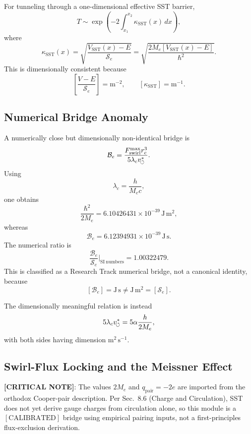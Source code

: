         For tunneling through a one-dimensional effective SST barrier,
        \[
            T
            \sim
            \exp\left(
                    -2\int_{x_1}^{x_2}\kappa_{\mathrm{SST}}(x)\,dx
            \right),
        \]
        where
        \[
            \kappa_{\mathrm{SST}}(x)
            =
            \sqrt{
                \frac{V_{\mathrm{SST}}(x)-E}{\mathcal S_e}
            }
            =
            \sqrt{
                \frac{2M_e\left[V_{\mathrm{SST}}(x)-E\right]}{\hbar^2}
            }.
        \]
        This is dimensionally consistent because
        \[
            \left[
                \frac{V-E}{\mathcal S_e}
            \right]
            =
            \mathrm{m^{-2}},
            \qquad
            [\kappa_{\mathrm{SST}}]=\mathrm{m^{-1}}.
        \]
    
    \subsection{Numerical Bridge Anomaly}
        
        A numerically close but dimensionally non-identical bridge is
        \[
            \mathcal B_e
            =
            \frac{F_{\text{swirl}}^{\max} r_c^3}
            {5\lambda_cv_{\!\boldsymbol{\circlearrowleft}}^{\ast}}.
        \]
        Using
        \[
            \lambda_c=\frac{h}{M_e c},
        \]
        one obtains
        \[
            \frac{\hbar^2}{2M_e}
            =
            6.10426431\times10^{-39}\,\mathrm{J\,m^2},
        \]
        whereas
        \[
            \mathcal B_e
            =
            6.12394931\times10^{-39}\,\mathrm{J\,s}.
        \]
        The numerical ratio is
        \[
            \frac{\mathcal B_e}{\mathcal S_e}\bigg|_{\mathrm{SI\ numbers}}
            =
            1.00322479.
        \]
        This is classified as a Research Track numerical bridge, not a canonical
        identity, because
        \[
            [\mathcal B_e]=\mathrm{J\,s}
            \neq
            \mathrm{J\,m^2}=[\mathcal S_e].
        \]
        
        The dimensionally meaningful relation is instead
        \[
            5\lambda_cv_{\!\boldsymbol{\circlearrowleft}}^{\ast}
            =
            5\alpha\frac{h}{2M_e},
        \]
        with both sides having dimension \(\mathrm{m^2\,s^{-1}}\).
    
    \subsection{Swirl-Flux Locking and the Meissner Effect}
        \textbf{[CRITICAL NOTE]}: The values $2M_e$ and $q_{\mathrm{pair}}=-2e$ are imported from the orthodox Cooper-pair description. Per Sec.~8.6 (Charge and Circulation), SST does not yet derive gauge charges from circulation alone, so this module is a $[\text{CALIBRATED}]$ bridge using empirical pairing inputs, not a first-principles flux-exclusion derivation.
        
